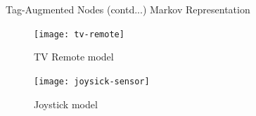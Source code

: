 \documentclass [xcolor=svgnames, t] {beamer}
\begin{document}
\begin{frame}{Tag-Augmented Nodes (contd...)}
    Markov Representation\\
        \vspace{.5cm}
        \begin{figure}[ht]
            \begin{minipage}[b]{0.45\linewidth}
             \centering
                 \texttt{[image: tv-remote]}
                 \caption{TV Remote model}
                 \label{fig:tv-remote}
             \end{minipage}
             \hspace{.5cm}
             \begin{minipage}[b]{0.45\linewidth}
                 \centering
                 \texttt{[image: joysick-sensor]}
                 \caption{Joystick model}
                 \label{fig:joysick-sensor}
             \end{minipage}
         \end{figure}

\end{frame}
\end{document}
